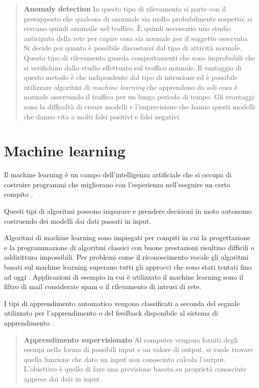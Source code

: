 \documentclass[../main.tex]{subfiles}
\begin{document}
\begin{verse}
				\textbf{Anomaly detection} In questo tipo di rilevamento si parte con il presupposto che qualcosa di anormale sia molto probabilmente sospetto, si cercano quindi anomalie nel traffico. È quindi necessario uno studio anticipato della rete per capire cosa sia normale per il soggetto osservato. Si decide poi quanto è possibile discostarsi dal tipo di attività normale. Questo tipo di rilevamento guarda comportamenti che sono improbabili che si verifichino dallo studio effettuato sul traffico normale.  
				Il vantaggio di questo metodo è che indipendente dal tipo di intrusione ed è possibile utilizzare algoritmi di \textit{machine learning} che apprendono da soli cosa è normale osservando il traffico per un lungo periodo di tempo.
				Gli svantaggi sono la difficoltà di creare modelli e l'imprecisione che hanno questi modelli che danno vita a molti falsi positivi e falsi negativi.
\end{verse}

\section{Machine learning}
Il machine learning è un campo dell'intelligenza artificiale che si occupa di costruire programmi che migliorano con l'esperienza nell'eseguire un certo compito \cite{mldef}.

Questi tipi di algoritmi possono imparare e prendere decisioni in moto autonomo costruendo dei modelli dai dati passati in input.


Algoritmi di machine learning sono impiegati per compiti in cui la progettazione e la programmazione di algoritmi classici con buone prestazioni risultino difficili o addirittura impossibili. Per problemi come il riconoscimento vocale gli algoritmi basati sul machine learning superano tutti gli approcci che sono stati tentati fino ad oggi \cite{mldef}.
Applicazioni di esempio in cui è utilizzato il machine learning sono il filtro di mail considerate spam o il rilevamento di intrusi di rete.




I tipi di apprendimento automatico vengono classificati a seconda del segnale utilizzato per l'apprendimento o del feedback disponibile al sistema di apprendimento \cite{ai}.

\begin{verse}
				\textbf{Apprendimento supervisionato} Al computer vengono forniti degli esempi nella forma di possibili input e un valore di output, si vuole trovare quella funzione che dato un input non conosciuto calcola l'output. L'obiettivo è quello di fare una previsione basata su proprietà conosciute apprese dai dati in input.
\end{verse}
\end{document}
